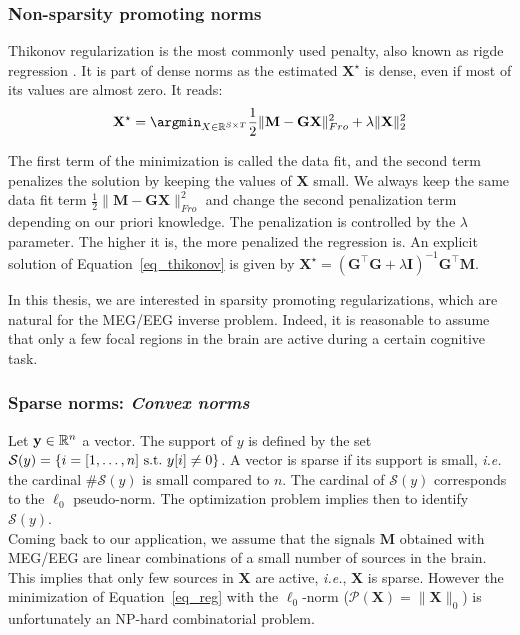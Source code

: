 \subsubsection*{Non-sparsity promoting norms}
Thikonov regularization \cite{tikhonov1977solutions} is the most commonly used penalty, also known as rigde regression \cite{hoerl1970ridge}. It is part of dense norms as the estimated $\mathbf{X}^\star$ is dense, even if most of its values are almost zero. It reads:
\begin{equation} \label{eq_thikonov}
	\mathbf{X}^\star = \argmin_{X\in\RR^{S\times T}}\frac{1}{2}\|\mathbf{M}-\mathbf{GX}\|_{Fro}^2 + \lambda\|\mathbf{X}\|_2^2
\end{equation}

The first term of the minimization is called the data fit, and the second term penalizes the solution by keeping the values of $\mathbf{X}$ small. We always keep the same data fit term $\frac{1}{2}\|\mathbf{M}-\mathbf{GX}\|_{Fro}^2$ and change the second penalization term depending on our priori knowledge. The penalization is controlled by the $\lambda$ parameter. The higher it is, the more penalized the regression is. An explicit solution of Equation~\eqref{eq_thikonov} is given by $\mathbf{X}^\star = (\mathbf{G}^\top\mathbf{G}+\lambda\mathbf{I})^{-1}\mathbf{G}^\top\mathbf{M}$. 

In this thesis, we are interested in sparsity promoting regularizations, which are natural for the MEG/EEG inverse problem. Indeed, it is reasonable to assume that only a few focal regions in the brain are active during a certain cognitive task.

\subsubsection*{Sparse norms: \textit{Convex norms}}
Let $\mathbf{y}\in\mathbb{R}^n$ a vector. The support of $y$ is defined by the set $\mathcal{S}(y) = \{i=[1,\dots ,n] \mathrm{\ s.t.\ } \\ y[i]\neq 0\}$.
A vector is sparse if its support is small, \textit{i.e.} the cardinal $\# \mathcal{S}(y)$ is small compared to $n$.
The cardinal of $\mathcal{S}(y)$ corresponds to the $\ell_0$ pseudo-norm. The optimization problem implies then to identify $\mathcal{S}(y)$.\\

Coming back to our application, we assume that the signals $\mathbf{M}$ obtained with MEG/EEG are linear combinations of a small number of sources in the brain. This implies that only few sources in $\mathbf{X}$ are active, \textit{i.e.}, $\mathbf{X}$ is sparse. However the minimization of Equation~\eqref{eq_reg} with the $\ell_0$-norm ($\mathcal{P}(\mathbf{X})=\|\mathbf{X}\|_0$) is unfortunately an NP-hard combinatorial problem.

